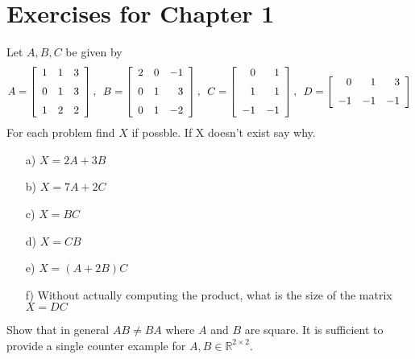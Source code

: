 \documentclass[12pt]{amsbook}
\numberwithin{equation}{section}
\theoremstyle{plain} %
\theoremstyle{definition}
\theoremstyle{remark}
\begin{document}
\section*{Exercises for Chapter 1}

\begin{Exercise}
Let $A, B, C$ be given by
\begin{align*}
A =  \left[ 
\begin{array}{ccc} 
1& 1&  3\\ \noalign{\medskip}   
0& 1&  3\\ \noalign{\medskip}         
1& 2   & 2 
\end{array}
 \right],\,\,\, B =  \left[ 
\begin{array}{rrr} 
2& 0&  -1\\ \noalign{\medskip}   
0& 1&  3\\ \noalign{\medskip}         
0& 1   & -2 
\end{array}
 \right],\,\,\,
 C=  \left[ 
\begin{array}{rr} 
0& 1\\ \noalign{\medskip}   
1& 1\\ \noalign{\medskip}         
-1& -1   
\end{array}
 \right] ,\,\,\,
 D=  \left[ 
\begin{array}{rrr} 
0& 1 & 3\\ \noalign{\medskip}          
-1& -1   &-1
\end{array}
 \right] 
\end{align*}
For each problem find $X$ if possble.  If X doesn't exist say why.
\begin{itemize}
\item[a)]$X =  2A+3B$
\item[b)]$ X =7A + 2C$
\item[c)]$X =  BC$
\item[d)] $X = CB$
\item[e)]$ X = (A+2B)C$
\item[f)] Without actually computing the product, what is the size of the matrix $X = DC$
\end{itemize}

\end{Exercise}


\begin{Exercise}
Show that in general $AB \ne BA $ where  $A$ and $B$ are square.  It is sufficient to provide a single counter example for $A, B \in \mathbb{R}^{2 \times 2}$.
\end{Exercise}
\end{document}
